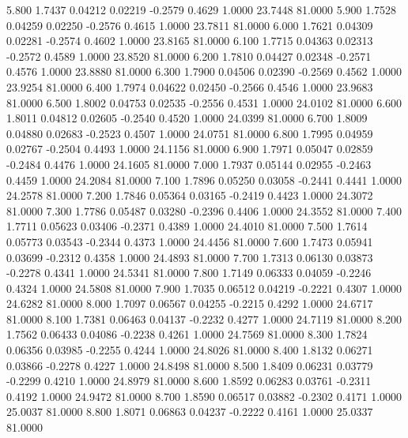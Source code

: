    5.800   1.7437   0.04212   0.02219  -0.2579   0.4629   1.0000  23.7448  81.0000
   5.900   1.7528   0.04259   0.02250  -0.2576   0.4615   1.0000  23.7811  81.0000
   6.000   1.7621   0.04309   0.02281  -0.2574   0.4602   1.0000  23.8165  81.0000
   6.100   1.7715   0.04363   0.02313  -0.2572   0.4589   1.0000  23.8520  81.0000
   6.200   1.7810   0.04427   0.02348  -0.2571   0.4576   1.0000  23.8880  81.0000
   6.300   1.7900   0.04506   0.02390  -0.2569   0.4562   1.0000  23.9254  81.0000
   6.400   1.7974   0.04622   0.02450  -0.2566   0.4546   1.0000  23.9683  81.0000
   6.500   1.8002   0.04753   0.02535  -0.2556   0.4531   1.0000  24.0102  81.0000
   6.600   1.8011   0.04812   0.02605  -0.2540   0.4520   1.0000  24.0399  81.0000
   6.700   1.8009   0.04880   0.02683  -0.2523   0.4507   1.0000  24.0751  81.0000
   6.800   1.7995   0.04959   0.02767  -0.2504   0.4493   1.0000  24.1156  81.0000
   6.900   1.7971   0.05047   0.02859  -0.2484   0.4476   1.0000  24.1605  81.0000
   7.000   1.7937   0.05144   0.02955  -0.2463   0.4459   1.0000  24.2084  81.0000
   7.100   1.7896   0.05250   0.03058  -0.2441   0.4441   1.0000  24.2578  81.0000
   7.200   1.7846   0.05364   0.03165  -0.2419   0.4423   1.0000  24.3072  81.0000
   7.300   1.7786   0.05487   0.03280  -0.2396   0.4406   1.0000  24.3552  81.0000
   7.400   1.7711   0.05623   0.03406  -0.2371   0.4389   1.0000  24.4010  81.0000
   7.500   1.7614   0.05773   0.03543  -0.2344   0.4373   1.0000  24.4456  81.0000
   7.600   1.7473   0.05941   0.03699  -0.2312   0.4358   1.0000  24.4893  81.0000
   7.700   1.7313   0.06130   0.03873  -0.2278   0.4341   1.0000  24.5341  81.0000
   7.800   1.7149   0.06333   0.04059  -0.2246   0.4324   1.0000  24.5808  81.0000
   7.900   1.7035   0.06512   0.04219  -0.2221   0.4307   1.0000  24.6282  81.0000
   8.000   1.7097   0.06567   0.04255  -0.2215   0.4292   1.0000  24.6717  81.0000
   8.100   1.7381   0.06463   0.04137  -0.2232   0.4277   1.0000  24.7119  81.0000
   8.200   1.7562   0.06433   0.04086  -0.2238   0.4261   1.0000  24.7569  81.0000
   8.300   1.7824   0.06356   0.03985  -0.2255   0.4244   1.0000  24.8026  81.0000
   8.400   1.8132   0.06271   0.03866  -0.2278   0.4227   1.0000  24.8498  81.0000
   8.500   1.8409   0.06231   0.03779  -0.2299   0.4210   1.0000  24.8979  81.0000
   8.600   1.8592   0.06283   0.03761  -0.2311   0.4192   1.0000  24.9472  81.0000
   8.700   1.8590   0.06517   0.03882  -0.2302   0.4171   1.0000  25.0037  81.0000
   8.800   1.8071   0.06863   0.04237  -0.2222   0.4161   1.0000  25.0337  81.0000
